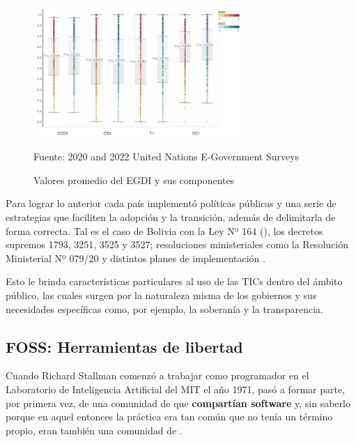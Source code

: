 \begin{figure}[!htpb]
    \centering
    \includegraphics[width=0.7\textwidth]{assets/egdi2020_2022}
    \caption{Valores promedio del EGDI y sus componentes}{Fuente: 2020 and 2022
        United Nations E-Government Surveys}
    \label{fig:egdi2020_2022}
\end{figure}

Para lograr lo anterior cada país implementó políticas públicas y una serie de estrategias que faciliten la adopción y la transición, además de delimitarla de forma correcta.
Tal es el caso de Bolivia con la Ley Nº 164 (\cite{Ley164Ley2011}), 
los decretos supremos 1793, 3251, 3525 y 3527; resoluciones ministeriales como la Resolución Ministerial Nº 079/20 y distintos planes de implementación \cite{DecretoSupremo17932013}\cite{DecretoSupremoNo2017}\cite{DECRETOSUPREMO35252018}\cite{DecretoSupremoNo2018}\cite{ResolucionMinisterialNo2020}\cite{PLANIMPLEMENTACIONSOFTWARE}.

Esto le brinda características particulares al uso de las TICs dentro del ámbito público, 
las cuales surgen por la naturaleza misma de los gobiernos y sus necesidades específicas como, por ejemplo, la soberanía y la transparencia.

\subsection{FOSS: Herramientas de libertad}

Cuando Richard Stallman comenzó a trabajar como programador en el Laboratorio de Inteligencia Artificial del MIT el año 1971, 
pasó a formar parte, por primera vez, de una comunidad de 
que \textbf{compartían software} y, sin saberlo porque en aquel entonces la práctica era tan común que no tenía un término propio, eran también una comunidad de  \cite{stallmanSoftwareLibrePara}.

